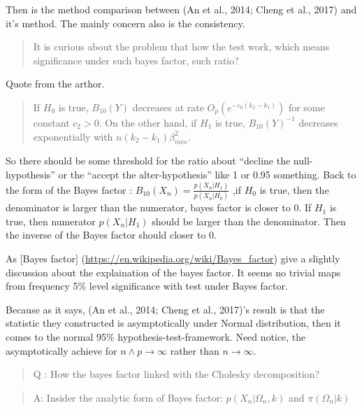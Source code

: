 \documentclass{beamer}
\begin{document}
\begin{frame}

Then is the method comparison between (An et al., 2014; Cheng et al.,
2017) and it's method. The mainly concern also is the consistency.

\begin{quote}
It is curious about the problem that how the test work, which means
significance under such bayes factor, such ratio?
\end{quote}

Quote from the arthor.

\begin{quote}
If \(H_0\) is true, \(B_{10}(Y)\) decreases at rate
\(O_p(e^{-c_0(k_2-k_1)})\) for some constant \(c_2>0\). On the other
hand, if \(H_1\) is true, \(B_{10}(Y)^{-1}\) decreases exponentially
with \(n(k_2-k_1)\beta^2_{min}\).
\end{quote}
\end{frame}

\begin{frame}

So there should be some threshold for the ratio about ``decline the
null-hypothesis'' or the ``accept the alter-hypothesis'' like 1 or 0.95
something. Back to the form of the Bayes factor :
\(B_{10}(X_{n})=\frac{p(X_n|H_1)}{p(X_n|H_0)}\) ,if \(H_0\) is true,
then the denominator is larger than the numerator, bayes factor is
closer to 0. If \(H_1\) is true, then numerator \(p(X_n|H_1)\) should be
larger than the denominator. Then the inverse of the Bayes factor should
closer to 0.

As {[}Bayes factor{]} (\url{https://en.wikipedia.org/wiki/Bayes_factor})
give a slightly discussion about the explaination of the bayes factor.
It seems no trivial maps from frequency 5\% level significance with test
under Bayes factor.

Because as it says, (An et al., 2014; Cheng et al., 2017)'s result is
that the statistic they constructed is asymptotically under Normal
distribution, then it comes to the normal 95\%
hypothesis-test-framework. Need notice, the asymptotically achieve for
\(n \wedge p \rightarrow \infty\) rather than \(n \rightarrow \infty\).
\end{frame}

\begin{frame}

\begin{quote}
Q : How the bayes factor linked with the Cholesky decomposition?
\end{quote}

\begin{quote}
A: Insider the analytic form of Bayes factor: \(p(X_n|\Omega_n,k)\) and
\(\pi(\Omega_n|k)\)
\end{quote}
\end{frame}
\end{document}
